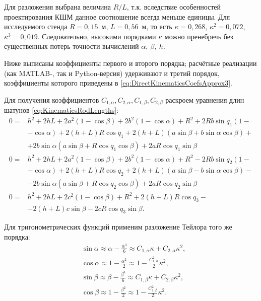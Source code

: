 Для разложения выбрана величина $R/L$, т.к. вследствие особенностей проектирования КШМ данное соотношение всегда меньше единицы. Для исследуемого стенда $R = 0{,}15$~м, $L = 0{,}56$~м, то есть $\kappa = 0{,}268$, $\kappa^2 = 0{,}072$, $\kappa^3 = 0{,}019$. Следовательно, высокими порядками $\kappa$ можно пренебречь без существенных потерь точности вычислений $\alpha,~\beta,~h$.

Ниже выписаны коэффициенты первого и второго порядка; расчётные реализации (как MATLAB-, так и Python-версия) удерживают и третий порядок, коэффициенты которого приведены в \ref{eq:DirectKinematicsCoefsApprox3}.

Для получения коэффициентов $C_{1,\alpha},C_{2,\alpha},C_{1,\beta},C_{2,\beta}$ раскроем уравнения длин шатунов \ref{eq:KinematicsRodLengths}:
\begin{equation}
\label{eq:DirectKinematicsRodLengthsFull}
	\begin{aligned}
	0 = & h^2 + 2hL + 2a^2\left(1-\cos\beta\right) + 2b^2\left(1-\cos\alpha\right) + R^2 + 2Rb\sin{q_1}\left(1 - \right.\\
	&\left.-\cos\alpha\right) + 2\left(h+L\right)R\cos{q_1} + 2\left(h+L\right)\left(a\sin\beta + b\sin\alpha\cos\beta\right)+\\
	& + 2b\sin\alpha\left(a\sin\beta + R\cos{q_1}\cos\beta\right) + 2aR\cos{q_1}\sin\beta \\
	0 = & h^2 + 2hL + 2a^2\left(1-\cos\beta\right) + 2b^2\left(1-\cos\alpha\right) + R^2 - 2Rb\sin{q_2}\left(1 -\right.\\
	&\left. - \cos\alpha\right) + 2\left(h+L\right)R\cos{q_2} + 2\left(h+L\right)\left(a\sin\beta - b\sin\alpha\cos\beta\right)-\\
	& - 2b\sin\alpha\left(a\sin\beta + R\cos{q_2}\cos\beta\right) + 2aR\cos{q_2}\sin\beta\\
	0 = & h^2 + 2hL + 2c^2\left(1-\cos\beta\right) + R^2 + 2\left(h+L\right)R\cos{q_3}-\\
	& - 2\left(h+L\right)c\sin\beta - 2cR\cos{q_3}\sin\beta.
	\end{aligned}
\end{equation}

Для тригонометрических функций применим разложение Тейлора того же порядка:
\begin{equation}
\label{eq:DirectKinematicsSinCosSeries}
\begin{aligned}
	& \sin\alpha \approx \alpha-\frac{\alpha^3}{6} \approx C_{1,\alpha}\kappa + C_{2,\alpha}\kappa^2,\\
	& \cos\alpha \approx 1 - \frac{\alpha^2}{2} \approx 1 - \frac{C^2_{1,\alpha}}{2}\kappa^2,\\
	& \sin\beta \approx \beta-\frac{\beta^3}{6} \approx C_{1,\beta}\kappa + C_{2,\beta}\kappa^2,\\
	& \cos\beta \approx 1 - \frac{\beta^2}{2} \approx 1 - \frac{C^2_{1,\beta}}{2}\kappa^2.
\end{aligned}
\end{equation}

